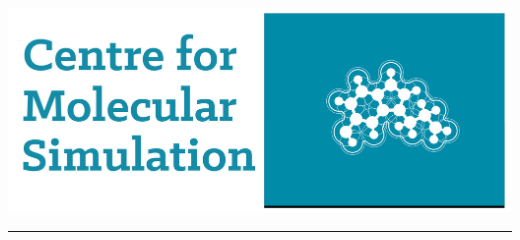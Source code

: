 \documentclass[a0,final,landscape]{a0poster}
\newenvironment{poster}{
  \begin{center}
  \begin{minipage}[c]{0.98\textwidth}
}{
  \end{minipage} 
  \end{center}
}
\newenvironment{pcolumn}[1]{
  \begin{minipage}{#1\textwidth}
  \begin{center}
}{
  \end{center}
  \end{minipage}
}
\begin{document}
\begin{poster}
\begin{center}
\begin{pcolumn}{0.99}
\begin{minipage}[c][8cm][c]{0.08\textwidth}
\begin{center}
    \hspace{1cm}
    \includegraphics[scale=1.3]{img/cms_logo.jpg}
  \end{center}
\end{minipage}
\vspace{0.5cm}
\begin{center}
\hspace{-1cm}\noindent\textcolor{blue1}{\rule{110cm}{0.2pt}}
\end{center}
\end{pcolumn}
\end{center}
\end{poster}

\end{document}
